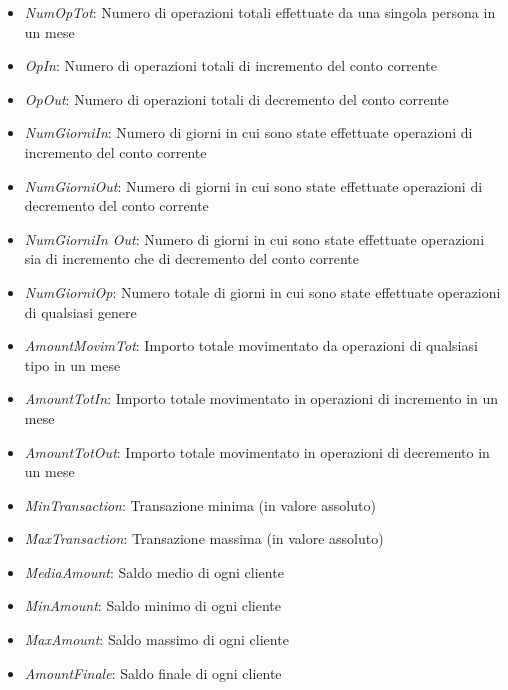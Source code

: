 \begin{itemize}
\item \textit{Num\textunderscore Op\textunderscore Tot}: Numero di operazioni totali effettuate da una singola persona in un mese
\item \textit{Op\textunderscore In}: Numero di operazioni totali di incremento del conto corrente \textunderscore
\item \textit{Op\textunderscore Out}: Numero di operazioni totali di decremento del conto corrente
\item \textit{Num\textunderscore Giorni\textunderscore In}: Numero di giorni in cui sono state effettuate operazioni di incremento del conto corrente
\item \textit{Num\textunderscore Giorni\textunderscore Out}: Numero di giorni in cui sono state effettuate operazioni di decremento del conto corrente
\item \textit{Num\textunderscore Giorni\textunderscore In \textunderscore Out}: Numero di giorni in cui sono state effettuate operazioni sia di incremento che di decremento del conto corrente
\item \textit{Num\textunderscore Giorni\textunderscore Op}: Numero totale di giorni in cui sono state effettuate operazioni di qualsiasi genere
\item \textit{Amount\textunderscore Movim\textunderscore Tot}: Importo totale movimentato da operazioni di qualsiasi tipo in un mese
\item \textit{Amount\textunderscore Tot\textunderscore  In}: Importo totale movimentato in operazioni di incremento in un mese
\item \textit{Amount\textunderscore Tot\textunderscore  Out}: Importo totale movimentato in operazioni di decremento in un mese
\item \textit{Min\textunderscore Transaction}: Transazione minima (in valore assoluto)
\item \textit{Max\textunderscore Transaction}: Transazione massima (in valore assoluto)
\item \textit{Media\textunderscore Amount}: Saldo medio di ogni cliente
\item \textit{Min\textunderscore Amount}: Saldo minimo di ogni cliente 
\item \textit{Max\textunderscore Amount}: Saldo massimo di ogni cliente
\item \textit{Amount\textunderscore Finale}: Saldo finale di ogni cliente 
\end{itemize}

